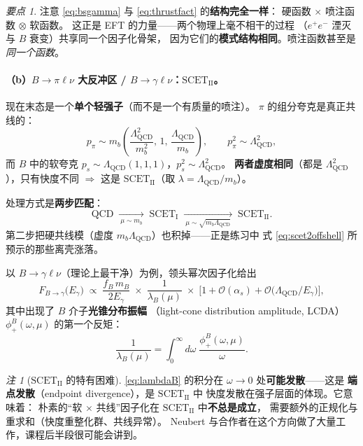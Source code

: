 \documentclass[UTF8,a4paper,11pt]{ctexart}
\theoremstyle{definition}
\theoremstyle{remark}
\newtheorem{remark}{注}[section]
\newtheorem{keypoint}{要点}[section]
\theoremstyle{plain}
\newcommand{\as}{\alpha_s}
\newcommand{\LQCD}{\Lambda_{\mathrm{QCD}}}
\newcommand{\SCETI}{\text{SCET}_{\mathrm{I}}}
\newcommand{\SCETII}{\text{SCET}_{\mathrm{II}}}
\newcommand{\en}[1]{\textsf{#1}}   %
\begin{document}
\begin{keypoint}
注意 \eqref{eq:bsgamma} 与 \eqref{eq:thrustfact} 的\textbf{结构完全一样}：
硬函数 $\times$ 喷注函数 $\otimes$ 软函数。
这正是 EFT 的力量——两个物理上毫不相干的过程
（$e^+e^-$ 湮灭与 $B$ 衰变）共享同一个因子化骨架，
因为它们的\textbf{模式结构相同}。喷注函数甚至是\emph{同一个函数}。
\end{keypoint}

\paragraph{（b）$B\to\pi\ell\nu$ 大反冲区 / $B\to\gamma\ell\nu$：$\SCETII$。}
现在末态是一个\textbf{单个轻强子}（而不是一个有质量的喷注）。
$\pi$ 的组分夸克是真正共线的：
\begin{equation}
  p_\pi\sim m_b\left(\frac{\LQCD^2}{m_b^2},\,1,\,\frac{\LQCD}{m_b}\right),
  \qquad
  p_\pi^2\sim\LQCD^2 ,
\end{equation}
而 $B$ 中的软夸克 $p_s\sim\LQCD(1,1,1)$，$p_s^2\sim\LQCD^2$。
\textbf{两者虚度相同}（都是 $\LQCD^2$），只有快度不同
$\Longrightarrow$ 这是 $\SCETII$（取 $\lambda=\LQCD/m_b$）。

处理方式是\textbf{两步匹配}：
\begin{equation}
  \text{QCD}
  \;\xrightarrow[\ \mu\sim m_b\ ]{}\;
  \SCETI
  \;\xrightarrow[\ \mu\sim\sqrt{m_b\LQCD}\ ]{}\;
  \SCETII .
  \label{eq:twostep}
\end{equation}
第二步把硬共线模（虚度 $m_b\LQCD$）也积掉——正是练习中
式 \eqref{eq:scet2offshell} 所预示的那些离壳涨落。

以 $B\to\gamma\ell\nu$（理论上最干净）为例，领头幂次因子化给出
\begin{equation}
  F_{B\to\gamma}\big(E_\gamma\big)
  \;\propto\;
  \frac{f_B\,m_B}{2E_\gamma}\;\times\;\frac{1}{\lambda_B(\mu)}
  \;\times\;\Big[1+\mathcal O(\as)+\mathcal O\big(\LQCD/E_\gamma\big)\Big],
  \label{eq:Bgamma}
\end{equation}
其中出现了 $B$ 介子\textbf{光锥分布振幅}
（\en{light-cone distribution amplitude}, LCDA）$\phi_+^B(\omega,\mu)$
的第一个反矩：
\begin{equation}
  \frac{1}{\lambda_B(\mu)}
  =\int_0^\infty\! d\omega\;\frac{\phi_+^B(\omega,\mu)}{\omega} .
  \label{eq:lambdaB}
\end{equation}

\begin{remark}[$\SCETII$ 的特有困难]
\eqref{eq:lambdaB} 的积分在 $\omega\to0$ 处\textbf{可能发散}——这是
\textbf{端点发散}（\en{endpoint divergence}），是 $\SCETII$ 中
快度发散在强子层面的体现。它意味着：
朴素的“软 $\times$ 共线”因子化在 $\SCETII$ 中\textbf{不总是成立}，
需要额外的正规化与重求和（快度重整化群、共线异常）。
Neubert 与合作者在这个方向做了大量工作，课程后半段很可能会讲到。
\end{remark}
\end{document}
